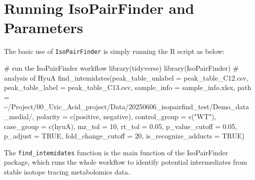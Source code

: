 \documentclass[
  letterpaper,
  DIV=11,
  numbers=noendperiod]{scrreprt}
\newenvironment{Shaded}{\begin{snugshade}}{\end{snugshade}}
\newcommand{\AttributeTok}[1]{\textcolor[rgb]{0.40,0.45,0.13}{#1}}
\newcommand{\CommentTok}[1]{\textcolor[rgb]{0.37,0.37,0.37}{#1}}
\newcommand{\ConstantTok}[1]{\textcolor[rgb]{0.56,0.35,0.01}{#1}}
\newcommand{\DecValTok}[1]{\textcolor[rgb]{0.68,0.00,0.00}{#1}}
\newcommand{\FloatTok}[1]{\textcolor[rgb]{0.68,0.00,0.00}{#1}}
\newcommand{\FunctionTok}[1]{\textcolor[rgb]{0.28,0.35,0.67}{#1}}
\newcommand{\NormalTok}[1]{\textcolor[rgb]{0.00,0.23,0.31}{#1}}
\newcommand{\StringTok}[1]{\textcolor[rgb]{0.13,0.47,0.30}{#1}}
\begin{document}
\section{Running IsoPairFinder and
Parameters}\label{sec-isoPairFinder-parameters}

The basic use of \texttt{IsoPairFinder} is simply running the R script
as below:

\begin{Shaded}
\begin{Highlighting}[]
\CommentTok{\# run the IsoPairFinder workflow}
\FunctionTok{library}\NormalTok{(tidyverse)}
\FunctionTok{library}\NormalTok{(IsoPairFinder)}
\CommentTok{\# analysis of HyuA}
\FunctionTok{find\_intemidates}\NormalTok{(}\AttributeTok{peak\_table\_unlabel =} \StringTok{\textquotesingle{}peak\_table\_C12.csv\textquotesingle{}}\NormalTok{,}
                 \AttributeTok{peak\_table\_label =} \StringTok{\textquotesingle{}peak\_table\_C13.csv\textquotesingle{}}\NormalTok{,}
                 \AttributeTok{sample\_info =} \StringTok{\textquotesingle{}sample\_info.xlsx\textquotesingle{}}\NormalTok{,}
                 \AttributeTok{path =} \StringTok{\textquotesingle{}\textasciitilde{}/Project/00\_Uric\_Acid\_project/Data/20250606\_isopairfind\_test/Demo\_data\_msdial/\textquotesingle{}}\NormalTok{,}
                 \AttributeTok{polarity =} \FunctionTok{c}\NormalTok{(}\StringTok{\textquotesingle{}positive\textquotesingle{}}\NormalTok{, }\StringTok{\textquotesingle{}negative\textquotesingle{}}\NormalTok{),}
                 \AttributeTok{control\_group =} \FunctionTok{c}\NormalTok{(}\StringTok{"WT"}\NormalTok{),}
                 \AttributeTok{case\_group =} \FunctionTok{c}\NormalTok{(}\StringTok{\textquotesingle{}hyuA\textquotesingle{}}\NormalTok{),}
                 \AttributeTok{mz\_tol =} \DecValTok{10}\NormalTok{,}
                 \AttributeTok{rt\_tol =} \FloatTok{0.05}\NormalTok{,}
                 \AttributeTok{p\_value\_cutoff =} \FloatTok{0.05}\NormalTok{,}
                 \AttributeTok{p\_adjust =} \ConstantTok{TRUE}\NormalTok{,}
                 \AttributeTok{fold\_change\_cutoff =} \DecValTok{20}\NormalTok{,}
                 \AttributeTok{is\_recognize\_adducts =} \ConstantTok{TRUE}\NormalTok{)}
\end{Highlighting}
\end{Shaded}

The \texttt{find\_intemidates} function is the main function of the
IsoPairFinder package, which runs the whole workflow to identify
potential intermediates from stable isotope tracing metabolomics data.
\end{document}
